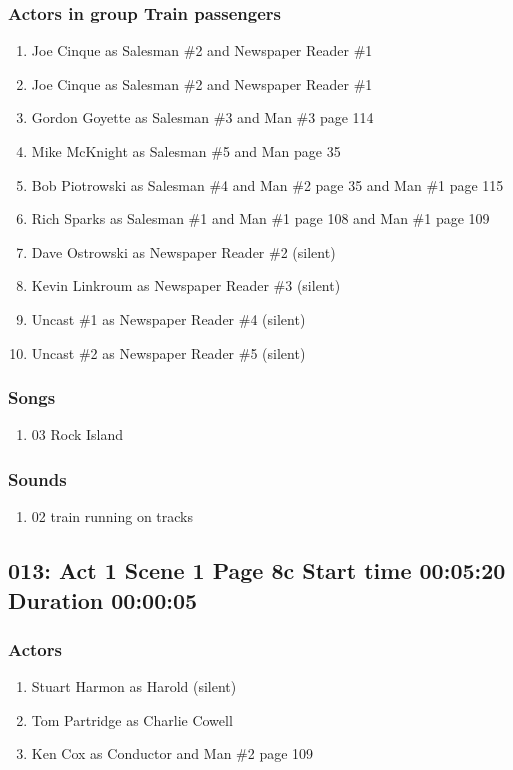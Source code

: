 \subsubsection{Actors in group Train passengers}
\begin{enumerate}
\item Joe Cinque as Salesman \#2 and Newspaper Reader \#1
\item Joe Cinque as Salesman \#2 and Newspaper Reader \#1
\item Gordon Goyette as Salesman \#3 and Man \#3 page 114
\item Mike McKnight as Salesman \#5 and Man page 35
\item Bob Piotrowski as Salesman \#4 and Man \#2 page 35 and Man \#1 page 115
\item Rich Sparks as Salesman \#1 and Man \#1 page 108 and Man \#1 page 109
\item Dave Ostrowski as Newspaper Reader \#2 (silent)
\item Kevin Linkroum as Newspaper Reader \#3 (silent)
\item Uncast \#1 as Newspaper Reader \#4 (silent)
\item Uncast \#2 as Newspaper Reader \#5 (silent)
\end{enumerate}

\subsubsection{Songs}
\begin{enumerate}
\item 03 Rock Island
\end{enumerate}\subsubsection{Sounds}
\begin{enumerate}
\item 02 train running on tracks
\end{enumerate}
\subsection{013: Act 1 Scene 1 Page 8c Start time 00:05:20 Duration 00:00:05}

\subsubsection{Actors}
\begin{enumerate}
\item Stuart Harmon as Harold (silent)
\item Tom Partridge as Charlie Cowell
\item Ken Cox as Conductor and Man \#2 page 109
\end{enumerate}
